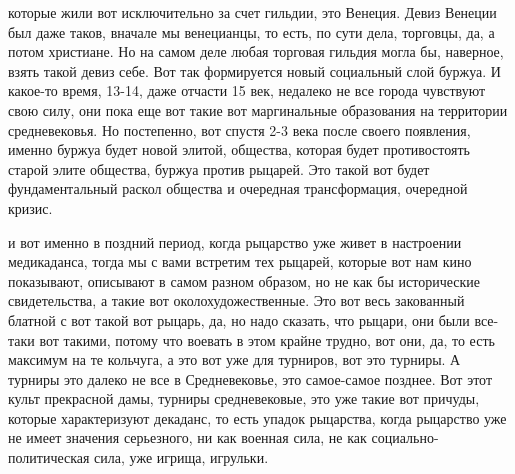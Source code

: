 которые жили вот исключительно за счет гильдии, это Венеция. Девиз Венеции был
даже таков, вначале мы венецианцы, то есть, по сути дела, торговцы, да, а потом
христиане. Но на самом деле любая торговая гильдия могла бы, наверное, взять
такой девиз себе. Вот так формируется новый
социальный слой буржуа. И какое-то время, 13-14, даже отчасти 15 век, недалеко
не все города чувствуют свою силу, они пока еще вот такие вот маргинальные
образования на территории средневековья. Но постепенно, вот спустя 2-3 века
после своего появления, именно буржуа будет новой элитой, общества, которая
будет противостоять старой элите общества, буржуа против рыцарей. Это такой вот
будет фундаментальный раскол общества и очередная трансформация, очередной
кризис. 

и вот именно в поздний период, когда рыцарство уже живет в настроении
медикаданса, тогда мы с вами встретим тех рыцарей, которые вот нам кино
показывают, описывают в самом разном образом, но не как бы исторические
свидетельства, а такие вот околохудожественные. Это вот весь закованный блатной с
вот такой вот рыцарь, да, но надо сказать, что рыцари, они были все-таки вот
такими, потому что воевать в этом крайне трудно, вот они, да, то есть максимум
на те кольчуга, а это вот уже для турниров, вот это турниры. А турниры это
далеко не все в Средневековье, это самое-самое позднее. Вот этот культ
прекрасной дамы, турниры средневековые, это уже такие вот причуды, которые
характеризуют декаданс, то есть упадок рыцарства, когда рыцарство уже не имеет
значения серьезного, ни как военная сила, не как социально-политическая сила,
уже игрища, игрульки. 

